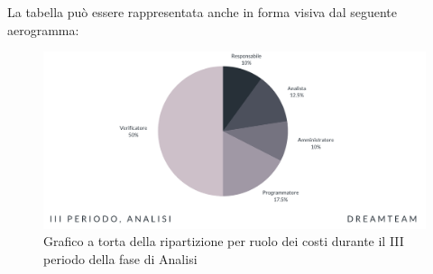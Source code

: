 La tabella può essere rappresentata anche in forma visiva dal seguente aerogramma:

\begin{figure}[!h]
\centering
\includegraphics[scale=0.65]{Sezioni/SezioniPreventivo/grafici/Analisi_III_periodo_costi.png}
\caption{Grafico a torta della ripartizione per ruolo dei costi durante il III periodo della fase di Analisi}
\end{figure}


